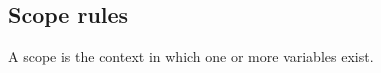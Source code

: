 \subsection*{Scope rules}

A scope is the context in which one or more variables exist.

%
%
%
%
%
%
%
%
%


